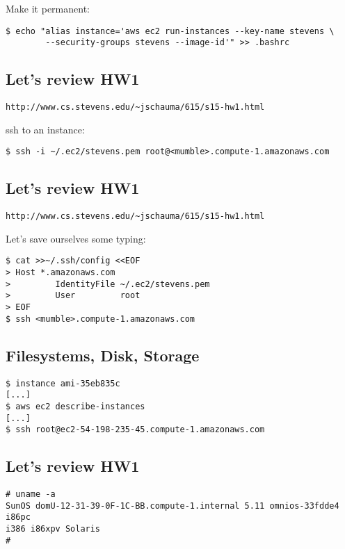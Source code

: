 \documentclass[xga]{xdvislides}
\begin{document}
Make it permanent:
\begin{verbatim}
$ echo "alias instance='aws ec2 run-instances --key-name stevens \
        --security-groups stevens --image-id'" >> .bashrc
\end{verbatim}


\subsection{Let's review HW1}
{\tt http://www.cs.stevens.edu/\~{}jschauma/615/s15-hw1.html} \\
\vspace{.5in}

ssh to an instance:
\begin{verbatim}
$ ssh -i ~/.ec2/stevens.pem root@<mumble>.compute-1.amazonaws.com
\end{verbatim}


\subsection{Let's review HW1}
{\tt http://www.cs.stevens.edu/\~{}jschauma/615/s15-hw1.html} \\
\vspace{.5in}

Let's save ourselves some typing:
\begin{verbatim}
$ cat >>~/.ssh/config <<EOF
> Host *.amazonaws.com
>         IdentityFile ~/.ec2/stevens.pem
>         User         root
> EOF
$ ssh <mumble>.compute-1.amazonaws.com
\end{verbatim}


\subsection{Filesystems, Disk, Storage}
\begin{verbatim}
$ instance ami-35eb835c
[...]
$ aws ec2 describe-instances
[...]
$ ssh root@ec2-54-198-235-45.compute-1.amazonaws.com
\end{verbatim}

\subsection{Let's review HW1}
\begin{verbatim}
# uname -a
SunOS domU-12-31-39-0F-1C-BB.compute-1.internal 5.11 omnios-33fdde4 i86pc
i386 i86xpv Solaris
#
\end{verbatim}
\end{document}
